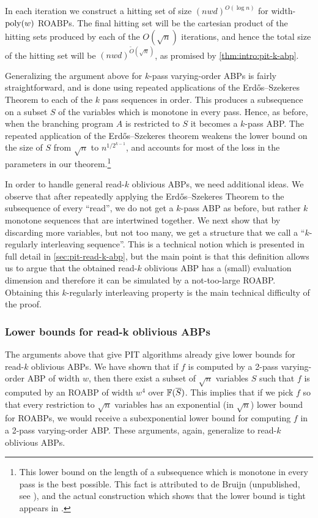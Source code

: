 \documentclass[11pt]{article}
\begin{document}
In each iteration we construct a hitting set of size $(nwd)^{O(\log n)}$ for width-$\operatorname{poly}(w)$ ROABPs.  
The final hitting set will be the cartesian product of the hitting sets produced by each of the $O(\sqrt{n})$ iterations, and hence the total size of the hitting set will be $(nwd)^{\tilde{O}(\sqrt{n})}$, as promised by \autoref{thm:intro:pit-k-abp}.

Generalizing the argument above for $k$-pass varying-order ABPs is fairly straightforward, and is done using repeated applications of the Erd\H{o}s--Szekeres Theorem to each of the $k$ pass sequences in order.
This produces a subsequence on a subset $S$ of the variables which is monotone in every pass. Hence, as before, when the branching program $A$ is restricted to $S$ it becomes a $k$-pass ABP.  
The repeated application of the Erd\H{o}s--Szekeres theorem weakens the lower bound on the size of $S$ from $\sqrt{n}$ to $n^{1/2^{k-1}}$, and accounts for most of the loss in the parameters in our theorem.\footnote{This lower bound on the length of a subsequence which is monotone in every pass is the best possible.
This fact is attributed to de Bruijn (unpublished, see \cite{Kru53}), and the actual construction which shows that the lower bound is tight appears in \cite{AFK85}.}

In order to handle general read-$k$ oblivious ABPs, we need additional ideas.
We observe that after repeatedly applying the Erd\H{o}s--Szekeres Theorem to the subsequence of every ``read'', we do not get a $k$-pass ABP as before, but rather $k$ monotone sequences that are intertwined together.
We next show that by discarding more variables, but not too many, we get a structure that we call a ``$k$-regularly interleaving sequence''.
This is a technical notion which is presented in full detail in \autoref{sec:pit-read-k-abp}, but the main point is that this definition allows us to argue that the obtained read-$k$ oblivious ABP has a (small) evaluation dimension and therefore it can be simulated by a not-too-large ROABP.
Obtaining this $k$-regularly interleaving property is the main technical difficulty of the proof.


\subsubsection{Lower bounds for read-k oblivious ABPs}

The arguments above that give PIT algorithms already give lower bounds for read-$k$ oblivious ABPs.
We have shown that if $f$ is computed by a 2-pass varying-order ABP of width $w$, then there exist a subset of $\sqrt{n}$ variables $S$ such that $f$ is computed by an ROABP of width $w^4$ over $\F(\overline{S})$.
This implies that if we pick $f$ so that every restriction to $\sqrt{n}$ variables has an exponential (in $\sqrt{n}$) lower bound for ROABPs, we would receive a subexponential lower bound for computing $f$ in a 2-pass varying-order ABP.
These arguments, again, generalize to read-$k$ oblivious ABPs.
\end{document}
